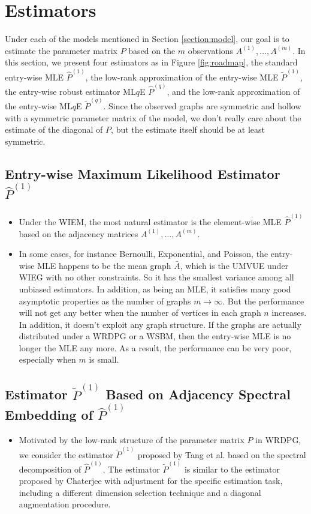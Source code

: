 \documentclass[a4paper]{article}
\renewcommand{\hat}{\widehat}
\begin{document}
\section{Estimators}

Under each of the models mentioned in Section \ref{section:model}, our goal is to estimate the parameter matrix $P$ based on the $m$ observations $A^{(1)}, \dotsc, A^{(m)}$. In this section, we present four estimators as in Figure \ref{fig:roadmap}, the standard entry-wise MLE $\hat{P}^{(1)}$, the low-rank approximation of the entry-wise MLE $\widetilde{P}^{(1)}$, the entry-wise robust estimator ML$q$E $\hat{P}^{(q)}$, and the low-rank approximation of the entry-wise ML$q$E $\widetilde{P}^{(q)}$. Since the observed graphs are symmetric and hollow with a symmetric parameter matrix of the model, we don't really care about the estimate of the diagonal of $P$, but the estimate itself should be at least symmetric.

\subsection{Entry-wise Maximum Likelihood Estimator $\hat{P}^{(1)}$}
\begin{itemize}
\item Under the WIEM, the most natural estimator is the element-wise MLE $\hat{P}^{(1)}$ based on the adjacency matrices $A^{(1)}, \dotsc, A^{(m)}$.
\item In some cases, for instance Bernoulli, Exponential, and Poisson, the entry-wise MLE happens to be the mean graph $\bar{A}$, which is the UMVUE under WIEG with no other constraints. So it has the smallest variance among all unbiased estimators. In addition, as being an MLE, it satisfies many good asymptotic properties as the number of graphs $m \to \infty$. But the performance will not get any better when the number of vertices in each graph $n$ increases. In addition, it doesn't exploit any graph structure. If the graphs are actually distributed under a WRDPG or a WSBM, then the entry-wise MLE is no longer the MLE any more. As a result, the performance can be very poor, especially when $m$ is small.
\end{itemize}


\subsection{Estimator $\widetilde{P}^{(1)}$ Based on Adjacency Spectral Embedding of $\hat{P}^{(1)}$}
\begin{itemize}
\item Motivated by the low-rank structure of the parameter matrix $P$ in WRDPG, we consider the estimator $\widetilde{P}^{(1)}$ proposed by Tang et al. \cite{tang2016law} based on the spectral decomposition of $\hat{P}^{(1)}$. The estimator $\widetilde{P}^{(1)}$ is similar to the estimator proposed by Chaterjee \cite{chatterjee2015matrix} with adjustment for the specific estimation task, including a different dimension selection technique and a diagonal augmentation procedure.
\end{itemize}
\end{document}
